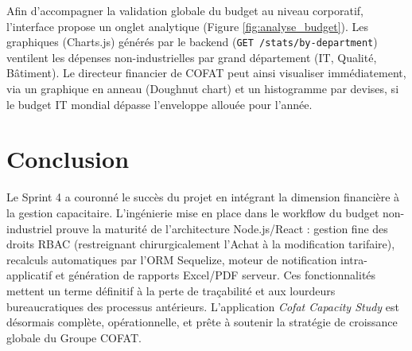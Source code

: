 Afin d'accompagner la validation globale du budget au niveau corporatif, l'interface propose un onglet analytique (Figure \ref{fig:analyse_budget}). Les graphiques (Charts.js) générés par le backend (\texttt{GET /stats/by-department}) ventilent les dépenses non-industrielles par grand département (IT, Qualité, Bâtiment). Le directeur financier de COFAT peut ainsi visualiser immédiatement, via un graphique en anneau (Doughnut chart) et un histogramme par devises, si le budget IT mondial dépasse l'enveloppe allouée pour l'année.

\section{Conclusion}
Le Sprint 4 a couronné le succès du projet en intégrant la dimension financière à la gestion capacitaire. L'ingénierie mise en place dans le workflow du budget non-industriel prouve la maturité de l'architecture Node.js/React : gestion fine des droits RBAC (restreignant chirurgicalement l'Achat à la modification tarifaire), recalculs automatiques par l'ORM Sequelize, moteur de notification intra-applicatif et génération de rapports Excel/PDF serveur. Ces fonctionnalités mettent un terme définitif à la perte de traçabilité et aux lourdeurs bureaucratiques des processus antérieurs. L'application \textit{Cofat Capacity Study} est désormais complète, opérationnelle, et prête à soutenir la stratégie de croissance globale du Groupe COFAT.
